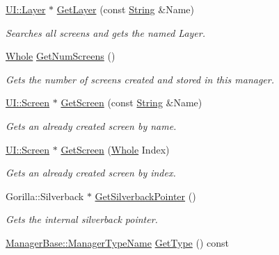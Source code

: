 \begin{DoxyCompactItemize}
\hyperlink{classphys_1_1UI_1_1Layer}{UI::Layer} $\ast$ \hyperlink{classphys_1_1UIManager_ab51c45a1ac2cbc6a4f1d826d1407ed65}{GetLayer} (const \hyperlink{namespacephys_aa03900411993de7fbfec4789bc1d392e}{String} \&Name)
\begin{DoxyCompactList}\small\item\em Searches all screens and gets the named Layer. \item\end{DoxyCompactList}\item 
\hyperlink{namespacephys_a460f6bc24c8dd347b05e0366ae34f34a}{Whole} \hyperlink{classphys_1_1UIManager_a3bd28c361f6fc79a182ebd3ec0a26ec7}{GetNumScreens} ()
\begin{DoxyCompactList}\small\item\em Gets the number of screens created and stored in this manager. \item\end{DoxyCompactList}\item 
\hyperlink{classphys_1_1UI_1_1Screen}{UI::Screen} $\ast$ \hyperlink{classphys_1_1UIManager_ad1ea734a094d7dcac729c6e2aa2987ad}{GetScreen} (const \hyperlink{namespacephys_aa03900411993de7fbfec4789bc1d392e}{String} \&Name)
\begin{DoxyCompactList}\small\item\em Gets an already created screen by name. \item\end{DoxyCompactList}\item 
\hyperlink{classphys_1_1UI_1_1Screen}{UI::Screen} $\ast$ \hyperlink{classphys_1_1UIManager_a82f130c650b679347f3bf66533f75db7}{GetScreen} (\hyperlink{namespacephys_a460f6bc24c8dd347b05e0366ae34f34a}{Whole} Index)
\begin{DoxyCompactList}\small\item\em Gets an already created screen by index. \item\end{DoxyCompactList}\item 
Gorilla::Silverback $\ast$ \hyperlink{classphys_1_1UIManager_a21623edd39c3e23de29f4cf3ed6e490a}{GetSilverbackPointer} ()
\begin{DoxyCompactList}\small\item\em Gets the internal silverback pointer. \item\end{DoxyCompactList}\item 
\hyperlink{classphys_1_1ManagerBase_aaa6ccddf23892eaccb898529414f80a5}{ManagerBase::ManagerTypeName} \hyperlink{classphys_1_1UIManager_ab8fe74564ca5dc09cbe4b1cc2c007e79}{GetType} () const 

\end{DoxyCompactItemize}
